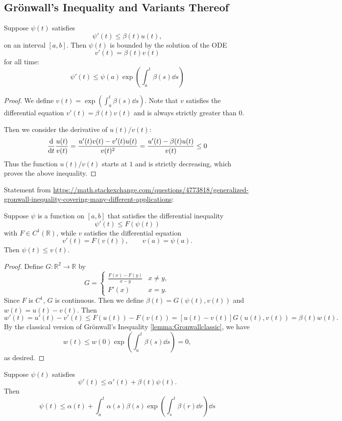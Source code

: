 \documentclass[prb,12pt]{revtex4-2}
\theoremstyle{definition}
\theoremstyle{definition}
\theoremstyle{definition}
\newcommand{\R}{\mathbb{R}}
\begin{document}
\subsection{Grönwall's Inequality and Variants Thereof}
\begin{Lemma}\label{lemma:Gronwallclassic}
	Suppose $\psi(t)$ satisfies
	\[\psi'(t)\le \beta(t)u(t),\]
	on an interval $[a,b]$. Then $\psi(t)$ is bounded by the solution of the ODE
	\[v'(t)=\beta(t)v(t)\]
	for all time:
	\[\psi'(t)\le \psi(a)\exp\left(\int_a^t \beta(s)\dd{s}\right)\]
\end{Lemma}
\begin{proof}
	We define $v(t)=\exp\left(\int_a^t \beta(s)\dd{s}\right)$. Note that $v$ satisfies the differential equation $v'(t)=\beta(t)v(t)$ and is always strictly greater than $0$. 
	
	Then we consider the derivative of $u(t)/v(t)$:
	\[\dv{t}\frac{u(t)}{v(t)}=\frac{u'(t)v(t)-v'(t)u(t)}{v(t)^2}=\frac{u'(t)-\beta(t)u(t)}{v(t)}\le 0\]
	Thus the function $u(t)/v(t)$ starts at $1$ and is strictly decreasing, which proves the above inequality.
\end{proof}
\begin{Lemma}
	Statement from \url{https://math.stackexchange.com/questions/4773818/generalized-gronwall-inequality-covering-many-different-applications}:

Suppose $\psi$ is a function on $[a,b]$ that satisfies the differential inequality
\[\psi'(t)\le F(\psi(t))\]
with $F\in C^1(\R)$, while $v$ satisfies the differential equation
\[v'(t)=F(v(t)),\qquad v(a)=\psi(a).\]
Then $\psi(t) \le v(t)$.
\end{Lemma}
\begin{proof}
	Define $G:\R^2 \to \R$ by
	\[G=\begin{cases}
		\frac{F(x)-F(y)}{x-y} & x\neq y,\\
		F'(x) & x=y.
	\end{cases}\]
	Since $F$ is $C^1$, $G$ is continuous. Then we define $\beta(t)=G(\psi(t), v(t))$ and $w(t)=u(t)-v(t)$. Then
	\[w'(t)=u'(t)-v'(t)\le F(u(t))-F(v(t))=[u(t)-v(t)]G(u(t),v(t))=\beta(t)w(t).\]
	By the classical version of Grönwall's Inequality \ref{lemma:Gronwallclassic}, we have
	\[w(t)\le w(0)\exp\left(\int_a^t \beta(s)\dd{s}\right)=0,\]
	as desired.
\end{proof}
\begin{Corollary}
	Suppose $\psi(t)$ satisfies
	\[\psi'(t) \le \alpha'(t)+\beta(t)\psi(t).\]
	Then
	\[\psi(t)\le \alpha(t)+\int_a^t \alpha(s)\beta(s)\exp\left(\int_s^t \beta(r)\dd{r}\right)\dd{s}\]
\end{Corollary}
\end{document}
